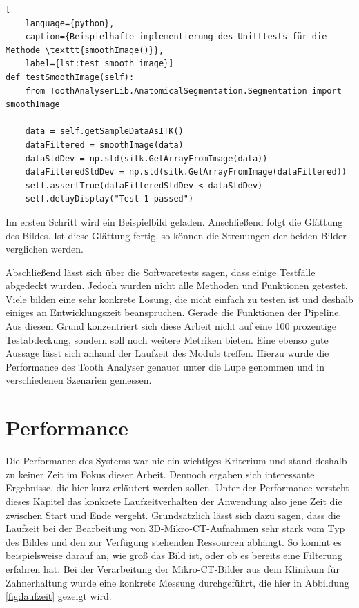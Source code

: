 \begin{lstlisting}[
    language={python},
    caption={Beispielhafte implementierung des Unitttests für die Methode \texttt{smoothImage()}},
    label={lst:test_smooth_image}]
def testSmoothImage(self):
    from ToothAnalyserLib.AnatomicalSegmentation.Segmentation import smoothImage
   
    data = self.getSampleDataAsITK()
    dataFiltered = smoothImage(data)
    dataStdDev = np.std(sitk.GetArrayFromImage(data))
    dataFilteredStdDev = np.std(sitk.GetArrayFromImage(dataFiltered))
    self.assertTrue(dataFilteredStdDev < dataStdDev)
    self.delayDisplay("Test 1 passed")
\end{lstlisting}

Im ersten Schritt wird ein Beispielbild geladen. Anschließend folgt die Glättung
des Bildes. Ist diese Glättung fertig, so können die Streuungen der beiden Bilder
verglichen werden.

Abschließend lässt sich über die Softwaretests sagen, dass einige Testfälle
abgedeckt wurden. Jedoch wurden nicht alle Methoden und Funktionen getestet.
Viele bilden eine sehr konkrete Lösung, die nicht einfach zu testen ist und deshalb
einiges an Entwicklungszeit beanspruchen. Gerade die Funktionen der Pipeline. Aus
diesem Grund konzentriert sich diese Arbeit nicht auf eine 100 prozentige Testabdeckung,
sondern soll noch weitere Metriken bieten. Eine ebenso gute Aussage lässt sich anhand
der Laufzeit des Moduls treffen. Hierzu wurde die Performance des Tooth Analyser
genauer unter die Lupe genommen und in verschiedenen Szenarien gemessen.

\pagebreak

\section{Performance}
Die Performance des Systems war nie ein wichtiges Kriterium und stand deshalb zu
keiner Zeit im Fokus dieser Arbeit. Dennoch ergaben sich interessante Ergebnisse,
die hier kurz erläutert werden sollen. Unter der Performance versteht dieses
Kapitel das konkrete Laufzeitverhalten der Anwendung also jene Zeit die zwischen
Start und Ende vergeht. Grundsätzlich lässt sich dazu sagen, dass die Laufzeit
bei der Bearbeitung von \ac{3D}-Mikro-\ac{CT}-Aufnahmen sehr stark vom Typ des
Bildes und den zur Verfügung stehenden Ressourcen abhängt. So kommt es beispielsweise
darauf an, wie groß das Bild ist, oder ob es bereits eine Filterung erfahren hat.
Bei der Verarbeitung der Mikro-\ac{CT}-Bilder aus dem Klinikum für Zahnerhaltung
wurde eine konkrete Messung durchgeführt, die hier in Abbildung
\ref{fig:laufzeit} gezeigt wird.

